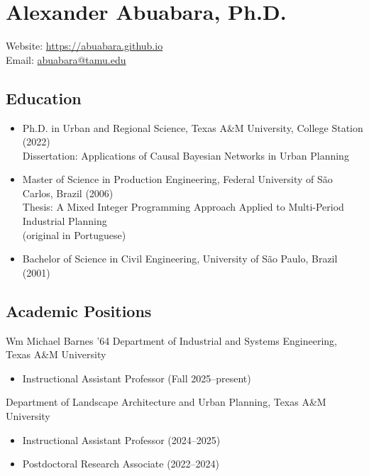 \documentclass[11pt]{article}
\begin{document}
\raggedright

\section*{Alexander Abuabara, Ph.D.}
Website: \url{https://abuabara.github.io}\\[1pt]
Email: \href{mailto:abuabara@tamu.edu}{abuabara@tamu.edu}

\subsection*{Education}
\begin{itemize}[leftmargin=20pt]
\item Ph.D. in Urban and Regional Science, Texas A\&M University, College Station (2022)\\[1pt]
      Dissertation: Applications of Causal Bayesian Networks in Urban Planning
\item Master of Science in Production Engineering, Federal University of São Carlos, Brazil (2006)\\[1pt]
      Thesis: A Mixed Integer Programming Approach Applied to Multi-Period Industrial Planning\\
      {\small (original in Portuguese)}
\item Bachelor of Science in Civil Engineering, University of São Paulo, Brazil (2001)
\end{itemize}

\subsection*{Academic Positions}
Wm Michael Barnes ’64 Department of Industrial and Systems Engineering, Texas A\&M University
\begin{itemize}[leftmargin=20pt]
\item Instructional Assistant Professor (Fall 2025--present)
\end{itemize}

\vspace{3pt}

Department of Landscape Architecture and Urban Planning, Texas A\&M University
\begin{itemize}[leftmargin=20pt]
\item Instructional Assistant Professor (2024--2025)
\item Postdoctoral Research Associate (2022--2024)
\end{itemize}
\end{document}

